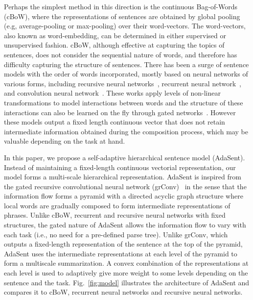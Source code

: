 \documentclass{article}
\theoremstyle{definition}
\begin{document}
Perhaps the simplest method in this direction is the continuous Bag-of-Words (cBoW), where the representations of sentences are obtained by global pooling (e.g, average-pooling or max-pooling) over their word-vectors. The word-vectors, also known as word-embedding, can be determined in either supervised or unsupervised fashion. cBoW, although effective at capturing the topics of sentences, does not consider the sequential nature of words, and therefore has difficulty capturing the structure of sentences. There has been a surge of sentence models with the order of words incorporated, mostly based on neural networks of various forms, including recursive neural networks~\cite{socher2010learning,socher2012semantic,socher2013recursive}, recurrent neural network~\cite{irsoy2014deep,lai2015recurrent}, and convolution neural network~\cite{KalchbrennerACL2014,kim2014convolutional}. These works apply levels of non-linear transformations to model interactions between words and the structure of these interactions can also be learned on the fly through gated networks~\cite{cho2014properties}.  However these models output a fixed length continuous vector that does not retain intermediate information obtained during the composition process, which may be valuable depending on the task at hand.

In this paper, we propose a self-adaptive hierarchical sentence model (AdaSent). Instead of maintaining a fixed-length continuous vectorial representation, our model forms a multi-scale hierarchical representation.  AdaSent is inspired from the gated recursive convolutional neural network (grConv)~\cite{cho2014properties} in the sense that the information flow forms a pyramid with a directed acyclic graph structure where local words are gradually composed to form intermediate representations of phrases.  Unlike cBoW, recurrent and recursive neural networks with fixed structures, the gated nature of AdaSent allows the information flow to vary with each task (i.e., no need for a pre-defined parse tree).  Unlike grConv, which outputs a fixed-length representation of the sentence at the top of the pyramid, AdaSent uses the intermediate representations at each level of the pyramid to form a multiscale summarization.  A convex combination of the representations at each level is used to adaptively give more weight to some levels depending on the sentence and the task.  Fig.~\ref{fig:model} illustrates the architecture of AdaSent and compares it to cBoW, recurrent neural networks and recursive neural networks.
\end{document}
